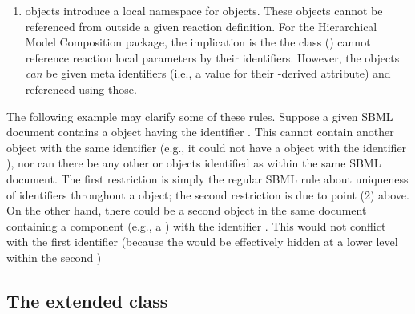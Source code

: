 \begin{enumerate}
\item \Reaction objects introduce a local namespace for \LocalParameter
  objects.  These objects cannot be referenced from outside a given
  reaction definition.  For the Hierarchical Model Composition package,
  the implication is the the \SBaseRef class ()
  cannot reference reaction local parameters by their identifiers.
  However, the \LocalParameter objects \emph{can} be given meta
  identifiers (i.e., a value for their \SBase-derived 
  attribute) and referenced using those.

% 


\end{enumerate}

The following example may clarify some of these rules.  Suppose a given
SBML document contains a \Model object having the identifier .
This \Model cannot contain another object with the same identifier
(e.g., it could not have a \Parameter object with the identifier
), nor can there be any other \Model or
\ExternalModelDefinition objects identified as  within the
same SBML document.  The first restriction is simply the regular SBML
rule about uniqueness of identifiers throughout a \Model object; the
second restriction is due to point (2) above.  On the other hand, there
could be a second \Model object in the same document containing a
component (e.g., a \Parameter) with the identifier .  This
would not conflict with the first \Model identifier (because the
\Parameter would be effectively hidden at a lower level within the
second \Model)


\subsection{The extended  class}
\label{sbml-class}
\label{listofmodeldefinitions-class}
\label{listofexternalmodeldefinitions-class}

